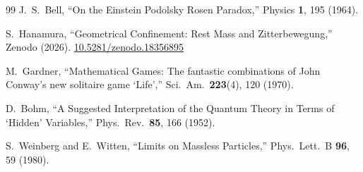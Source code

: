 \documentclass[%
 reprint, amsmath,amssymb, aps, prb, ]{revtex4-2}
\numberwithin{equation}{section}
\begin{document}
\begin{thebibliography}{99}
 J.~S.~Bell, ``On the Einstein Podolsky Rosen Paradox,'' Physics \textbf{1}, 195 (1964).

 S.~Hanamura, ``Geometrical Confinement: Rest Mass and Zitterbewegung,'' Zenodo (2026). \href{https://doi.org/10.5281/zenodo.18356895}{10.5281/zenodo.18356895}

 M.~Gardner, ``Mathematical Games: The fantastic combinations of John Conway's new solitaire game `Life','' Sci.\ Am.\ \textbf{223}(4), 120 (1970).

 D.~Bohm, ``A Suggested Interpretation of the Quantum Theory in Terms of `Hidden' Variables,'' Phys.\ Rev.\ \textbf{85}, 166 (1952).

 S.~Weinberg and E.~Witten, ``Limits on Massless Particles,'' Phys.\ Lett.\ B \textbf{96}, 59 (1980).

\end{thebibliography}
\end{document}
